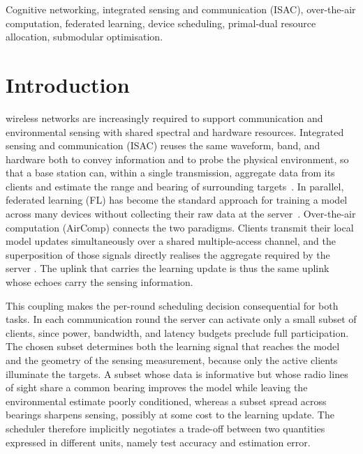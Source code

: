 \documentclass[lettersize,journal]{IEEEtran}
\begin{document}
\begin{IEEEkeywords}
Cognitive networking, integrated sensing and communication (ISAC), over-the-air computation, federated learning, device scheduling, primal-dual resource allocation, submodular optimisation.
\end{IEEEkeywords}

\section{Introduction}\label{sec:intro}
 wireless networks are increasingly required to support communication and environmental sensing with shared spectral and hardware resources. Integrated sensing and communication (ISAC) reuses the same waveform, band, and hardware both to convey information and to probe the physical environment, so that a base station can, within a single transmission, aggregate data from its clients and estimate the range and bearing of surrounding targets~\cite{liu2022isac,cui2021isac}. In parallel, federated learning (FL) has become the standard approach for training a model across many devices without collecting their raw data at the server~\cite{mcmahan2017fedavg}. Over-the-air computation (AirComp) connects the two paradigms. Clients transmit their local model updates simultaneously over a shared multiple-access channel, and the superposition of those signals directly realises the aggregate required by the server \cite{an2026otafl}. The uplink that carries the learning update is thus the same uplink whose echoes carry the sensing information.

This coupling makes the per-round scheduling decision consequential for both tasks. In each communication round the server can activate only a small subset of clients, since power, bandwidth, and latency budgets preclude full participation. The chosen subset determines both the learning signal that reaches the model and the geometry of the sensing measurement, because only the active clients illuminate the targets. A subset whose data is informative but whose radio lines of sight share a common bearing improves the model while leaving the environmental estimate poorly conditioned, whereas a subset spread across bearings sharpens sensing, possibly at some cost to the learning update. The scheduler therefore implicitly negotiates a trade-off between two quantities expressed in different units, namely test accuracy and estimation error.
\end{document}
